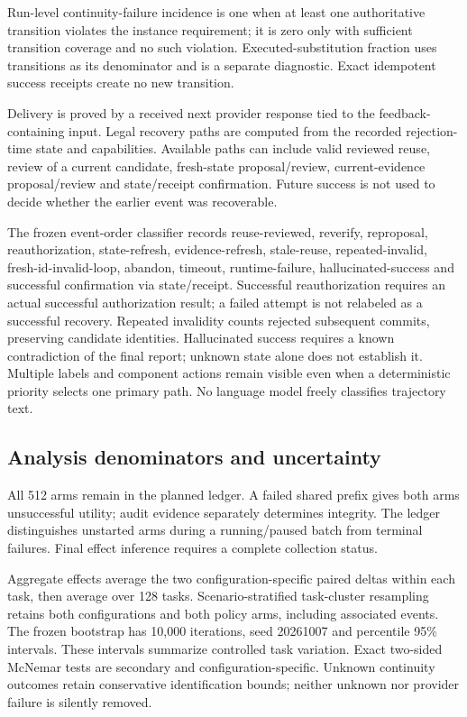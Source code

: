 \documentclass[11pt,a4paper]{article}
\begin{document}
Run-level continuity-failure incidence is one when at least one authoritative transition violates the instance requirement; it is zero only with sufficient transition coverage and no such violation. Executed-substitution fraction uses transitions as its denominator and is a separate diagnostic. Exact idempotent success receipts create no new transition.

Delivery is proved by a received next provider response tied to the feedback-containing input. Legal recovery paths are computed from the recorded rejection-time state and capabilities. Available paths can include valid reviewed reuse, review of a current candidate, fresh-state proposal/review, current-evidence proposal/review and state/receipt confirmation. Future success is not used to decide whether the earlier event was recoverable.

The frozen event-order classifier records reuse-reviewed, reverify, reproposal, reauthorization, state-refresh, evidence-refresh, stale-reuse, repeated-invalid, fresh-id-invalid-loop, abandon, timeout, runtime-failure, hallucinated-success and successful confirmation via state/receipt. Successful reauthorization requires an actual successful authorization result; a failed attempt is not relabeled as a successful recovery. Repeated invalidity counts rejected subsequent commits, preserving candidate identities. Hallucinated success requires a known contradiction of the final report; unknown state alone does not establish it. Multiple labels and component actions remain visible even when a deterministic priority selects one primary path. No language model freely classifies trajectory text.

\subsection{Analysis denominators and uncertainty}
All 512 arms remain in the planned ledger. A failed shared prefix gives both arms unsuccessful utility; audit evidence separately determines integrity. The ledger distinguishes unstarted arms during a running/paused batch from terminal failures. Final effect inference requires a complete collection status.

Aggregate effects average the two configuration-specific paired deltas within each task, then average over 128 tasks. Scenario-stratified task-cluster resampling retains both configurations and both policy arms, including associated events. The frozen bootstrap has 10,000 iterations, seed 20261007 and percentile 95\% intervals. These intervals summarize controlled task variation. Exact two-sided McNemar tests are secondary and configuration-specific. Unknown continuity outcomes retain conservative identification bounds; neither unknown nor provider failure is silently removed.
\end{document}
